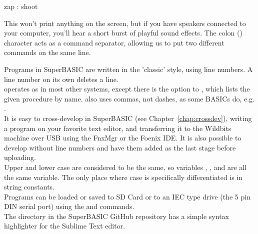 \begin{lst}
zap : shoot
\end{lst}

This won't print anything on the screen, but if you have speakers connected to your computer, you'll hear a short burst of playful sound effects. The colon (\code{:}) character acts as a command separator, allowing us to put two different commands on the same line.






Programs in SuperBASIC are written in the 'classic' style, using line numbers. A line number on its own deletes a line.\\

 operates as in most other systems, except there is the option to , which lists the given procedure by name.  also uses commas, not dashes, as some BASICs do, e.g. .\\

It is easy to cross-develop in SuperBASIC (see Chapter~\ref{chap:crossdev}), writing a program on your favorite text editor, and transferring it to the Wildbits machine over USB using the FnxMgr or the Foenix IDE. It is also possible to develop without line numbers and have them added as the last stage before uploading.\\

Upper and lower case are considered to be the same, so variables , , and  are all the same variable. The only place where case is specifically differentiated is in string constants.\\

Programs can be loaded or saved to SD Card or to an IEC type drive (the 5 pin DIN serial port) using the  and  commands.\\

The  directory in the SuperBASIC GitHub repository has a simple syntax highlighter for the Sublime Text editor.\\



